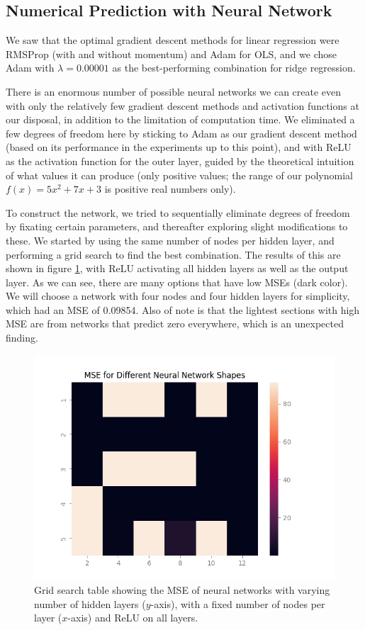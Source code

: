 \subsection{Numerical Prediction with Neural Network}
We saw that the optimal gradient descent methods for linear regression were RMSProp (with and without momentum) and Adam for OLS, and we chose Adam with $\lambda = 0.00001$ as the best-performing combination for ridge regression. 

There is an enormous number of possible neural networks we can create even with only the relatively few gradient descent methods and activation functions at our disposal, in addition to the limitation of computation time. We eliminated a few degrees of freedom here by sticking to Adam as our gradient descent method (based on its performance in the experiments up to this point), and with ReLU as the activation function for the outer layer, guided by the theoretical intuition of what values it can produce (only positive values; the range of our polynomial $f(x) = 5x^2 + 7x + 3$ is positive real numbers only).

To construct the network, we tried to sequentially eliminate degrees of freedom by fixating certain parameters, and thereafter exploring slight modifications to these. We started by using the same number of nodes per hidden layer, and performing a grid search to find the best combination. The results of this are shown in figure \ref{fig:gridsearch_numpred_layers_nodes}, with ReLU activating all hidden layers as well as the output layer. As we can see, there are many options that have low MSEs (dark color). We will choose a network with four nodes and four hidden layers for simplicity, which had an MSE of 0.09854. Also of note is that the lightest sections with high MSE are from networks that predict zero everywhere, which is an unexpected finding.  
\begin{figure}
    \centering
    \includegraphics[width=\linewidth]{figures/all_plots/gridsearch_numpred_layers_nodes.png}
    \caption{Grid search table showing the MSE of neural networks with varying number of hidden layers ($y$-axis), with a fixed number of nodes per layer ($x$-axis) and ReLU on all layers.}
    \label{fig:gridsearch_numpred_layers_nodes}
\end{figure}

